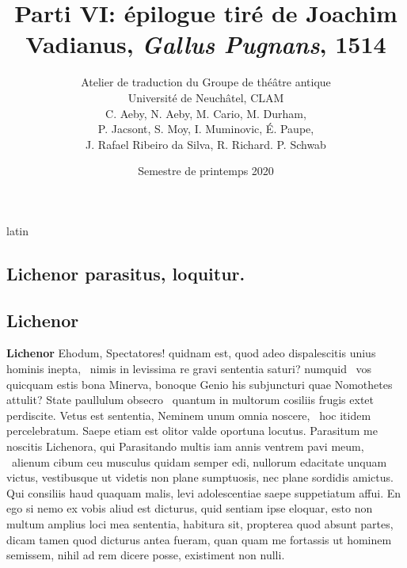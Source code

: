 \documentclass[12pt]{book}
\renewenvironment{latin}
    	{\begin{hyphenrules}{latin}}
    	{\end{hyphenrules}}
\begin{document}
        \title{Parti VI: épilogue tiré de Joachim Vadianus, \textit{Gallus Pugnans}, 1514}
        \author{Atelier de traduction du Groupe de théâtre antique\\
            Université de Neuchâtel, CLAM\\
            C. Aeby, N. Aeby, M. Cario, M. Durham,\\ 
            P. Jacsont, S. Moy, I. Muminovic, É. Paupe,\\
            J. Rafael Ribeiro da Silva, R. Richard. P. Schwab}
        \date{Semestre de printemps 2020}
        
        \maketitle
        \begin{pages}
        \begin{latin}
        \begin{Leftside}
        \beginnumbering 
            \pstart\section*{Lichenor parasitus, loquitur.}\pend\pstart\subsection*{Lichenor}\pend\pstart\textbf{Lichenor}\hspace{1cm} 
                    Ehodum, Spectatores! quidnam est, quod adeo dispalescitis unius hominis inepta, ﻿\ampersand\ nimis in levissima re gravi sententia saturi? 
                    numquid ﻿\ampersand\ vos quicquam estis bona Minerva, bonoque Genio his subjuncturi quae Nomothetes attulit? 
                    State paullulum   obsecro ﻿\ampersand\ quantum in multorum cosiliis frugis extet perdiscite. 
                    Vetus est sententia, Neminem unum omnia noscere, ﻿\ampersand\ hoc itidem percelebratum. 
                    Saepe etiam est olitor valde oportuna locutus. 
                    Parasitum me noscitis Lichenora, qui Parasitando multis iam annis ventrem pavi meum, ﻿\ampersand\ alienum cibum ceu musculus quidam semper edi, nullorum edacitate unquam victus, vestibusque ut videtis non plane sumptuosis, nec plane sordidis amictus. 
                    Qui consiliis haud quaquam malis, levi adolescentiae saepe suppetiatum affui. 
                    En ego si nemo ex vobis aliud est dicturus, quid sentiam ipse eloquar, esto non multum amplius loci mea sententia, habitura sit, propterea quod absunt partes, dicam tamen quod dicturus antea fueram, quan quam me fortassis ut hominem semissem, nihil ad rem dicere posse, existiment non nulli. 

\end{Leftside}
\end{latin}
\end{pages}
\end{document}
